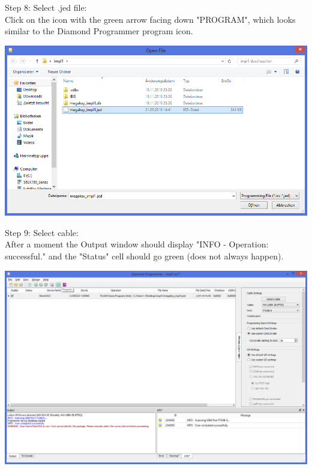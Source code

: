 \begin{minipage}{\linewidth}
  Step 8: Select .jed file: \\
Click on the icon with the green arrow facing down "PROGRAM",
which looks similar to the Diamond Programmer program icon.
  \begin{center}
  \includegraphics[width=0.8\linewidth]{images/diamond08.png}
  \end{center}
\end{minipage}


\begin{minipage}{\linewidth}
Step 9: Select cable: \\
After a moment the Output window should display
"INFO - Operation: successful." and the "Status" cell should
go green (does not always happen).
  \begin{center}
  \includegraphics[width=0.8\linewidth]{images/diamond09.png}
  \end{center}
\end{minipage}

\vspace{5mm}

